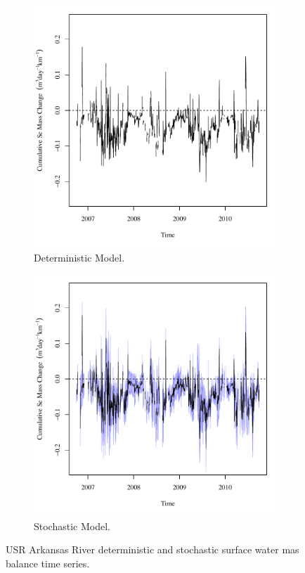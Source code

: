 \begin{linenumbers}
\begin{figure}[htbp]
\centering
	\begin{subfigure}{0.5\textwidth}
		\centering
		\includegraphics[width=0.9\linewidth]{"Figures/Results_DUSR/Balance Mass - Flux"}
		\caption{Deterministic Model.}
		\label{sub:USRMassStoreD}
	\end{subfigure}%
	\begin{subfigure}{0.5\textwidth}
		\centering
		\includegraphics[width=0.9\linewidth]{"Figures/Results_USR/Balance Mass - Flux"}
		\caption{Stochastic Model.}
		\label{sub:USRMassStoreS}
	\end{subfigure}
	\caption[USR Arkansas River deterministic and stochastic surface water mas balance time series.]{USR Arkansas River deterministic and stochastic surface water mas balance time series.}
	\label{fig:USRMassStore}
\end{figure}


\end{linenumbers}
